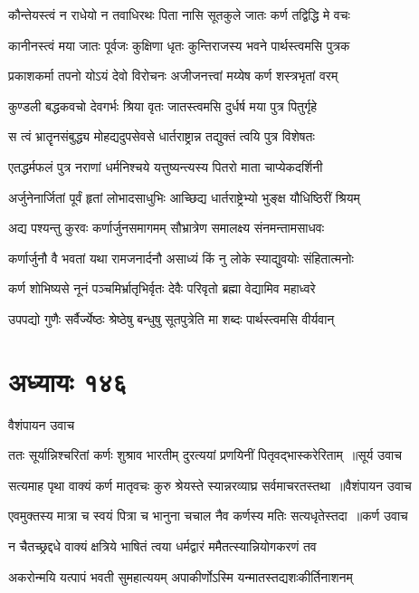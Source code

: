 \twolineshloka
{कौन्तेयस्त्वं न राधेयो न तवाधिरथः पिता}
{नासि सूतकुले जातः कर्ण तद्विद्धि मे वचः}


\twolineshloka
{कानीनस्त्वं मया जातः पूर्वजः कुक्षिणा धृतः}
{कुन्तिराजस्य भवने पार्थस्त्वमसि पुत्रक}


\twolineshloka
{प्रकाशकर्मा तपनो योऽयं देवो विरोचनः}
{अजीजनत्त्वां मय्येष कर्ण शस्त्रभृतां वरम्}


\twolineshloka
{कुण्डली बद्धकवचो देवगर्भः श्रिया वृतः}
{जातस्त्वमसि दुर्धर्ष मया पुत्र पितुर्गृहे}


\twolineshloka
{स त्वं भ्रातॄनसंबुद्ध्य मोहद्यदुपसेवसे}
{धार्तराष्ट्रान्न तद्युक्तं त्वयि पुत्र विशेषतः}


\twolineshloka
{एतद्धर्मफलं पुत्र नराणां धर्मनिश्चये}
{यत्तुष्यन्त्यस्य पितरो माता चाप्येकदर्शिनी}


\twolineshloka
{अर्जुनेनार्जितां पूर्वं हृतां लोभादसाधुभिः}
{आच्छिद्य धार्तराष्ट्रेभ्यो भुङ्क्ष यौधिष्ठिरीं श्रियम्}


\threelineshloka
{अद्य पश्यन्तु कुरवः कर्णार्जुनसमागमम्}
{सौभ्रात्रेण समालक्ष्य संनमन्तामसाधवः}
{}


\twolineshloka
{कर्णार्जुनौ वै भवतां यथा रामजनार्दनौ}
{असाध्यं किं नु लोके स्याद्युवयोः संहितात्मनोः}


\twolineshloka
{कर्ण शोभिष्यसे नूनं पञ्चमिर्भ्रातृभिर्वृतः}
{देवैः परिवृतो ब्रह्मा वेद्यामिव महाध्वरे}


\twolineshloka
{उपपद्यो गुणैः सर्वैर्ज्येष्ठः श्रेष्ठेषु बन्धुषु}
{सूतपुत्रेति मा शब्दः पार्थस्त्वमसि वीर्यवान्}


\chapter{अध्यायः १४६}
\twolineshloka
{वैशंपायन उवाच}
{}


\threelineshloka
{ततः सूर्यान्निश्चरितां कर्णः शुश्राव भारतीम्}
{दुरत्ययां प्रणयिनीं पितृवद्भास्करेरिताम् ॥सूर्य उवाच}
{}


\threelineshloka
{सत्यमाह पृथा वाक्यं कर्ण मातृवचः कुरु}
{श्रेयस्ते स्यान्नरव्याघ्र सर्वमाचरतस्तथा ॥वैशंपायन उवाच}
{}


\threelineshloka
{एवमुक्तस्य मात्रा च स्वयं पित्रा च भानुना}
{चचाल नैव कर्णस्य मतिः सत्यधृतेस्तदा ॥कर्ण उवाच}
{}


\twolineshloka
{न चैतच्छ्रद्दधे वाक्यं क्षत्रिये भाषितं त्वया}
{धर्मद्वारं ममैतत्स्यान्नियोगकरणं तव}


\twolineshloka
{अकरोन्मयि यत्पापं भवती सुमहात्ययम्}
{अपाकीर्णोऽस्मि यन्मातस्तद्यशःकीर्तिनाशनम्}


